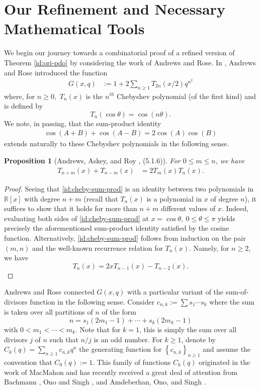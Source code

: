 \documentclass[11pt,reqno]{amsart}
\numberwithin{equation}{section}
\theoremstyle{plain}
\newtheorem{proposition}[theorem]{Proposition}
\theoremstyle{definition}
\theoremstyle{named}
\newcommand{\set}[1]{\left\{#1\right\}}
\def\bR{\mathbb{R}}
\begin{document}
\section{Our Refinement and Necessary Mathematical Tools}\label{sec:tools}
We begin our journey towards a combinatorial proof of a refined version of Theorem \ref{id:ori-pdo} by considering the work of Andrews and Rose.  In \cite{AR13}, Andrews and Rose introduced the function 
\begin{align}\label{defn:Gxq}
G(x,q) &:= 1+2\sum_{n\geq 1} T_{2n}(x/2)q^{n^2}
\end{align}
where, for $n\geq 0,$ $T_n(x)$ is the $n^{th}$ Chebyshev polynomial (of the first kind) \cite[p.~101]{AARsf} and is defined by 
$$T_n(\cos\theta) = \cos(n\theta).$$
We note, in passing, that 
the sum-product identity 
\begin{align}\label{id:cos-sum-product}
\cos(A+B)+\cos(A-B)=2\cos(A)\cos(B)
\end{align}
extends naturally to these Chebyshev polynomials in the following sense.
\begin{proposition}[Andrews, Askey, and Roy \cite{AARsf}, (5.1.6)]
For $0\le m\le n$, we have
\begin{align}\label{id:cheby-sum-prod}
T_{n+m}(x)+T_{n-m}(x) &= 2T_m(x)T_n(x).
\end{align}
\end{proposition}
\begin{proof}
Seeing that \eqref{id:cheby-sum-prod} is an identity between two polynomials in $\bR[x]$ with degree $n+m$ (recall that $T_n(x)$ is a polynomial in $x$ of degree $n$), it suffices to show that it holds for more than $n+m$ different values of $x$. Indeed, evaluating both sides of \eqref{id:cheby-sum-prod} at $x=\cos\theta,~0\le \theta\le \pi$ yields precisely the aforementioned sum-product identity satisfied by the cosine function. Alternatively, \eqref{id:cheby-sum-prod} follows from induction on the pair $(m,n)$ and the well-known recurrence relation for $T_n(x)$. Namely, for $n\ge 2$, we have
$$T_n(x)=2xT_{n-1}(x)-T_{n-2}(x).$$
\end{proof}

Andrews and Rose \cite{AR13} connected $G(x,q)$ with a particular variant of the sum-of-divisors function in the following sense. Consider $c_{n,k}:=\sum s_1\cdots s_k$ where the sum is taken over all partitions of $n$ of the form
$$n=s_1(2m_1-1)+\cdots+s_k(2m_k-1)$$
with $0<m_1<\cdots<m_k$. Note that for $k=1$, this is simply the sum over all divisors $j$ of $n$ such that $n/j$ is an odd number. For $k\ge 1$, denote by $C_k(q)=\sum_{n\ge 1}c_{n,k}q^n$ the generating function for $\set{c_{n,k}}_{n\ge 1}$ and assume the convention that $C_0(q):=1$. This family of functions $C_k(q)$ originated in the work of MacMahon \cite{Mac} and has recently received a great deal of attention from Bachmann \cite{Ba24}, Ono and Singh \cite{OS24}, and Amdeberhan, Ono, and Singh \cite{AOS24}.  
\end{document}

